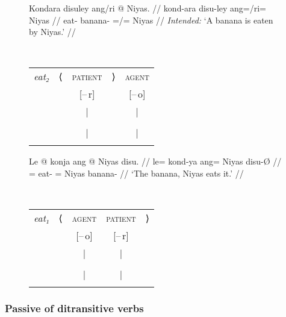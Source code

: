 \begin{figure}
\pex\label{ex:passzn2}
\a\label{ex:passzn2_inst}%
\ljudge*%
\begin{minipage}[t]{.5\remaining}
\begingl
	\gla Kondara disuley ang/ri @ Niyas. //
	\glb kond-ara disu-ley ang=/ri= Niyas //
	\glc eat-\TsgI{} banana-\PargI{} \Aarg{}=/\Ins{}= Niyas //
	\glft \textit{Intended:} `A banana is eaten by Niyas.' //
\endgl
\end{minipage}
~
\begin{tabular}[t]{>{\itshape}l l c r c}
eat₂
	& ⟨
	& \textsc{patient}
	& ⟩
	& \textsc{agent}
	\\
%
	& %
	& [–\,r]
	& %
	& [–\,o]
	\\

%
	& %
	& |
	& %
	& |
	\\

%
	& %
	& \Subj
	& %
	& \Oblq{agt}
	\\

%
	& %
	& |
	& %
	& |
	\\

%
	& %
	& \fw{banana}
	& %
	& \fw{Niyas}
	\\
\end{tabular}

\a\label{ex:passzn2_pt}%
\begin{minipage}[t]{.5\remaining}
\begingl
	\gla Le @ konja ang @ Niyas disu. //
	\glb le= kond-ya ang= Niyas disu-Ø //
	\glc \PatT{}= eat-\TsgM{} \Aarg{}= Niyas banana-\Top{} //
	\glft `The banana, Niyas eats it.' //
\endgl
\end{minipage}
~
\begin{tabular}[t]{>{\itshape}l l c c r}
eat₁
	& ⟨
	& \textsc{agent}
	& \textsc{patient}
	& ⟩
	\\
%
	& %
	& [–\,o]
	& [–\,r]
	& %
	\\

%
	& %
	& |
	& |
	& %
	\\

%
	& %
	& \Subj
	& \Obj*
	& %
	\\

%
	& %
	& |
	& |
	& %
	\\

%
	& %
	& \fw{Niyas}
	& \fw{banana}
	& %
	\\
\end{tabular}

\xe
\end{figure}


\subsubsection{Passive of ditransitive verbs}

